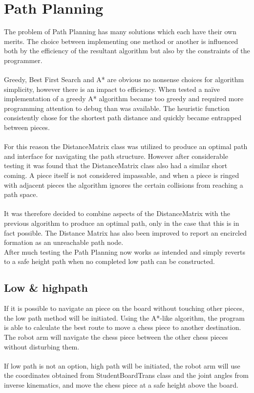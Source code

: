 \documentclass[11pt,a4paper]{article}
\begin{document}
\section{Path Planning}
The problem of Path Planning has many solutions which each have their own merits. The choice between implementing one method or another is influenced both by the efficiency of the resultant algorithm but also by the constraints of the programmer.\\
\\
\noindent
Greedy, Best First Search and A* are obvious no nonsense choices for algorithm simplicity, however there is an impact to efficiency. When tested a na\"ive implementation of a greedy A* algorithm became too greedy and required more programming attention to debug than was available. The heuristic function consistently chose for the shortest path distance and quickly became entrapped between pieces.\\
\\
\noindent
For this reason the DistanceMatrix class was utilized to produce an optimal path and interface for navigating the path structure. However after considerable testing it was found that the DistanceMatrix class also had a similar short coming. A piece itself is not considered impassable, and when a piece is ringed with adjacent pieces the algorithm ignores the certain collisions from reaching a path space.\\
\\
\noindent
It was therefore decided to combine aspects of the DistanceMatrix with the previous algorithm to produce an optimal path, only in the case that this is in fact possible. The Distance Matrix has also been improved to report an encircled formation as an unreachable path node.\\
After much testing the Path Planning now works as intended and simply reverts to a safe height path when no completed low path can be constructed.

\subsection{Low \& highpath}
If it is possible to navigate an piece on the board without touching other pieces, the low path method will be initiated. Using the A*-like algorithm, the program is able to calculate the best route to move a chess piece to another destination. The robot arm will navigate the chess piece between the other chess pieces without disturbing them.\\
\\
\noindent
If low path is not an option, high path will be initiated, the robot arm will use the coordinates obtained from StudentBoardTrans class and the joint angles from inverse kinematics, and move the chess piece at a safe height above the board.
\end{document}
